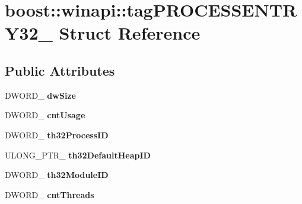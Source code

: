 \hypertarget{structboost_1_1winapi_1_1tag_p_r_o_c_e_s_s_e_n_t_r_y32__}{}\section{boost\+:\+:winapi\+:\+:tag\+P\+R\+O\+C\+E\+S\+S\+E\+N\+T\+R\+Y32\+\_\+ Struct Reference}
\label{structboost_1_1winapi_1_1tag_p_r_o_c_e_s_s_e_n_t_r_y32__}
\subsection*{Public Attributes}
\begin{DoxyCompactItemize}
\item 
\mbox{\label{structboost_1_1winapi_1_1tag_p_r_o_c_e_s_s_e_n_t_r_y32___aa1302d8e2e28bbd50ef0f60ed53a8652}} 
D\+W\+O\+R\+D\+\_\+ {\bfseries dw\+Size}
\item 
\mbox{\label{structboost_1_1winapi_1_1tag_p_r_o_c_e_s_s_e_n_t_r_y32___a498cc39b1afbde0011c5a2956596bf93}} 
D\+W\+O\+R\+D\+\_\+ {\bfseries cnt\+Usage}
\item 
\mbox{\label{structboost_1_1winapi_1_1tag_p_r_o_c_e_s_s_e_n_t_r_y32___a6b92a9740a4b73d85cc12e5b3056a57e}} 
D\+W\+O\+R\+D\+\_\+ {\bfseries th32\+Process\+ID}
\item 
\mbox{\label{structboost_1_1winapi_1_1tag_p_r_o_c_e_s_s_e_n_t_r_y32___a9d20048d3ac6eafc33d3dd3919fe86ea}} 
U\+L\+O\+N\+G\+\_\+\+P\+T\+R\+\_\+ {\bfseries th32\+Default\+Heap\+ID}
\item 
\mbox{\label{structboost_1_1winapi_1_1tag_p_r_o_c_e_s_s_e_n_t_r_y32___ad1fc79a06d9b3a80cf23e106ec5f3997}} 
D\+W\+O\+R\+D\+\_\+ {\bfseries th32\+Module\+ID}
\item 
\mbox{\label{structboost_1_1winapi_1_1tag_p_r_o_c_e_s_s_e_n_t_r_y32___a9dcff6a0c959b32be469650601b976c7}} 
D\+W\+O\+R\+D\+\_\+ {\bfseries cnt\+Threads}

\end{DoxyCompactItemize}
